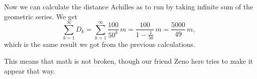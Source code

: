 \documentclass{article}
\begin{document}
Now we can calculate the distance Achilles as to run by taking infinite sum of the geometric series. We get
\begin{equation*}
    \sum_{k=1}^\infty D_k = \sum_{k=1}^\infty \frac{100}{50^k}\,m = \frac{100}{1-\frac{1}{50}}\,m = \frac{5000}{49}\,m,
\end{equation*}
which is the same result we got from the previous calculations.

This means that math is not broken, though our friend Zeno here tries to make it appear that way.
\end{document}
